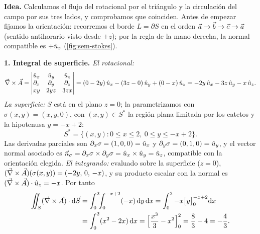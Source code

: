 \begin{resolucion}
\textbf{Idea.} Calculamos el flujo del rotacional por el triángulo y la
circulación del campo por sus tres lados, y comprobamos que coinciden. Antes de
empezar fijamos la orientación: recorremos el borde $L=\partial S$ en el orden
$\vec{a}\to\vec{b}\to\vec{c}\to\vec{a}$ (sentido antihorario visto desde $+z$); por la
regla de la mano derecha, la normal compatible es $+\hat{u}_{z}$ (\cref{fig:sem-stokes}).

\textbf{1. Integral de superficie.} \emph{El rotacional:}
\[
  \vec{\nabla}\times\vec{A}=
  \begin{vmatrix}
    \hat{u}_{x} & \hat{u}_{y} & \hat{u}_{z}\\
    \partial_x & \partial_y & \partial_z\\
    xy & 2yz & 3zx
  \end{vmatrix}
  =(0-2y)\,\hat{u}_{x}-(3z-0)\,\hat{u}_{y}+(0-x)\,\hat{u}_{z}=-2y\,\hat{u}_{x}-3z\,\hat{u}_{y}-x\,\hat{u}_{z} .
\]
\emph{La superficie:} $S$ está en el plano $z=0$; la parametrizamos con
$\sigma(x,y)=(x,y,0)$, con $(x,y)\in S^{*}$ la región plana limitada por los catetos y la
hipotenusa $y=-x+2$:
\[
  S^{*}=\{(x,y):0\le x\le2,\ 0\le y\le-x+2\}.
\]
Las derivadas parciales son $\partial_x\sigma=(1,0,0)=\hat{u}_{x}$ y
$\partial_y\sigma=(0,1,0)=\hat{u}_{y}$, y el vector normal asociado es
$\vec{n}_\sigma=\partial_x\sigma\times\partial_y\sigma=\hat{u}_{x}\times\hat{u}_{y}=\hat{u}_{z}$, compatible con la orientación
elegida. \emph{El integrando:} evaluado sobre la superficie ($z=0$),
$(\vec{\nabla}\times\vec{A})(\sigma(x,y))=(-2y,\,0,\,-x)$, y su producto escalar con la normal
es $(\vec{\nabla}\times\vec{A})\cdot\hat{u}_{z}=-x$. Por tanto
\begin{align*}
  \iint_S(\vec{\nabla}\times\vec{A})\cdot\mathrm{d}\vec{S}&=\int_0^2\!\!\int_0^{-x+2}(-x)\,\mathrm{d} y\,\mathrm{d} x
  =\int_0^2-x\bigl[y\bigr]_0^{-x+2}\mathrm{d} x\\
  &=\int_0^2(x^{2}-2x)\,\mathrm{d} x
  =\Bigl[\frac{x^{3}}{3}-x^{2}\Bigr]_0^2=\frac83-4=-\frac43 .
\end{align*}


\end{resolucion}
